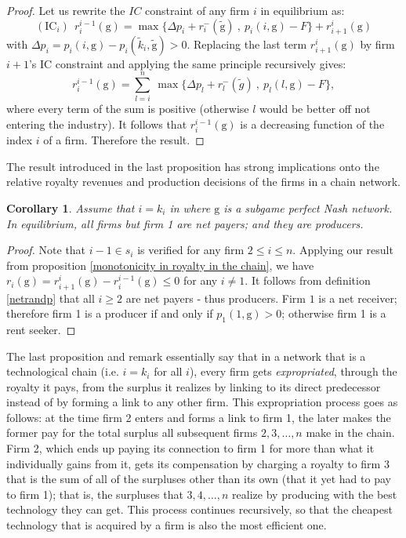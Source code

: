 \documentclass{article}
\newtheorem{corollary}{Corollary}
\begin{document}
\begin{proof}
Let us rewrite the $IC$ constraint of any firm $i$ in equilibrium as:
\begin{equation*}
(\text{IC}_i)~~ r^{i-1}_i(\text{g})= \max\{\Delta p_i+ r^-_i(\tilde{\text{g}})~,~ p_i(i,\text{g})-F\}+  r^{i}_{i+1}(\text{g})
\end{equation*}
with $\Delta p_i=p_i(i,\text{g})-p_i(\tilde{k}_i,\tilde{\text{g}})>0$. Replacing the last term $r^{i}_{i+1}(\text{g})$ by firm $i+1$'s IC constraint and applying the same principle recursively gives: 
\begin{equation*}
r^{i-1}_i(\text{g})= \sum_{l=i}^{n} ~\max\{\Delta p_l + r^-_l(\tilde{g}) ~,~ p_l(l,\text{g})-F\},
\end{equation*}
where every term of the sum is positive (otherwise $l$ would be better off not entering the industry). It follows that $r^{i-1}_i(\text{g})$ is a decreasing function of the index $i$ of a firm. Therefore the result. 
\end{proof}

The result introduced in the last proposition has strong implications onto the relative royalty revenues and production decisions of the firms in a chain network. \\

\begin{corollary}
Assume that $i=k_i$ in  where $\text{g}$ is a subgame perfect Nash network. In equilibrium, all firms but firm 1 are net payers; and they are producers.  
\end{corollary}
\begin{proof}
Note that $i-1\in s_i$ is verified for any firm $2\leq i\leq n$. Applying our result from proposition \ref{monotonicity in royalty in the chain}, we have $r_i(\text{g})=r^{i}_{i+1}(\text{g})-r^{i-1}_i(\text{g})\leq 0$ for any $i\neq 1$. It follows from definition \ref{netrandp} that all $i\geq 2$ are net payers - thus producers. Firm $1$ is a net receiver; therefore firm 1 is a producer if and only if $p_1(1,\text{g})>0$; otherwise firm 1 is a rent seeker. 
\end{proof}

The last proposition and remark essentially say that in a network that is a technological chain (i.e. $i=k_i$ for all $i$), every firm gets \textit{expropriated}, through the royalty it pays, from the surplus it realizes by linking to its direct predecessor instead of by forming a link to any other firm. This expropriation process goes as follows: at the time firm 2 enters and forms a link to firm 1, the later makes the former pay for the total surplus all subsequent firms $2,3,\ldots,n$ make in the chain. Firm 2, which ends up paying its connection to firm 1 for more than what it individually gains from it, gets its compensation by charging a royalty to firm 3 that is the sum of all of the surpluses other than its own (that it yet had to pay to firm 1); that is, the surpluses that $3,4,\ldots ,n$ realize by producing with the best technology they can get. This process continues recursively, so that the cheapest technology that is acquired by a firm is also the most efficient one. 
\end{document}
